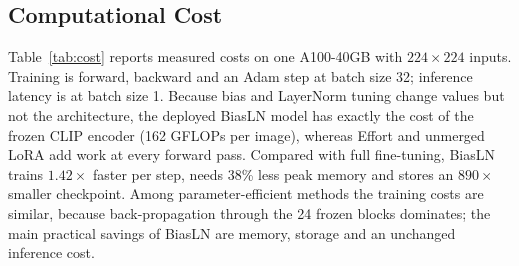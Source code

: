 \documentclass[fonts]{icst}
\newif\ifrevmark\revmarkfalse
\newcommand{\rev}[1]{\ifrevmark{\color{revblue}#1}\else#1\fi}
\newenvironment{revblock}{\ifrevmark\color{revblue}\fi}{}
\begin{document}
\begin{revblock}
\subsection{Computational Cost}
\label{sec:cost}
Table~\ref{tab:cost} reports measured costs on one A100-40GB with $224\times224$ inputs. Training is forward, backward and an Adam step at batch size 32; inference latency is at batch size 1. Because bias and LayerNorm tuning change values but not the architecture, the deployed BiasLN model has exactly the cost of the frozen CLIP encoder (162 GFLOPs per image), whereas Effort and unmerged LoRA add work at every forward pass. Compared with full fine-tuning, BiasLN trains $1.42\times$ faster per step, needs 38\% less peak memory and stores an $890\times$ smaller checkpoint. Among parameter-efficient methods the training costs are similar, because back-propagation through the 24 frozen blocks dominates; the main practical savings of BiasLN are memory, storage and an unchanged inference cost.
\end{revblock}

\begin{table}[H]
\centering
\captionsetup{labelsep=period, labelfont=bf, hypcap=false}
\caption{\rev{Measured cost on an NVIDIA A100-40GB (fp32, $224\times224$). Train: batch 32, forward + backward + Adam step. Infer: batch 1. Ckpt: size of the stored trainable tensors.}}
\label{tab:cost}
\end{table}
\end{document}
